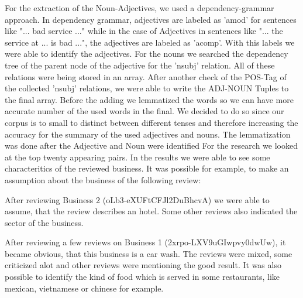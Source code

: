 For the extraction of the Noun-Adjectives, we used a dependency-grammar approach. In dependency grammar, adjectives are labeled as 'amod' for sentences like "... bad service ..." while in the case of Adjectives in sentences like "... the service at ... is bad ...", the adjectives are labeled as 'acomp'. With this labels we were able to identify the adjectives. For the nouns we searched the dependency tree of the parent node of the adjective for 
	the 'nsubj' relation. All of these relations were being stored in an array. After another check of the POS-Tag of the collected 'nsubj' relations, we were able to write the ADJ-NOUN Tuples to the final array. Before the adding we lemmatized the words so we can have more accurate number of the used words in the final. We decided to do so since our corpus is to small to distinct between different tenses and therefore increasing the accuracy for the summary of the used adjectives and nouns. The lemmatization was done after the Adjective and Noun were identified For the research we looked at the top twenty appearing pairs.
	In the results we were able to see some characteritics of the reviewed business. It  was possible for example, to make an assumption about the business of the following review:

	After reviewing Business 2 (oLb3-eXUFtCFJl2DuBhcvA)  we were able to assume, that the review describes an hotel. Some other reviews also indicated the sector of the business. 

	After reviewing a few reviews on Business 1 (2xrpo-LXV9uGIwpvy0dwUw), it became obvious, that this business is a car wash. The reviews were mixed, some criticized alot and other reviews were mentioning the good result.  
	It was also possible to identify the kind of food which is served in some restaurants, like mexican, vietnamese or chinese for example.

	
	
